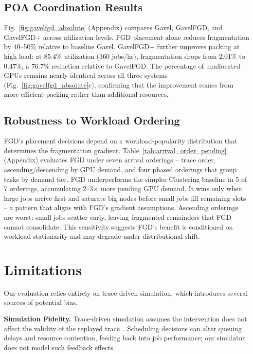 \documentclass[conference]{IEEEtran}
\begin{document}
\subsection{POA Coordination Results}

Fig.~\ref{fig:gavelfgd_absolute} (Appendix) compares Gavel, GavelFGD, and GavelFGD+ across utilization levels.
FGD placement alone reduces fragmentation by 40--50\% relative to baseline Gavel.
GavelFGD+ further improves packing at high load: at 85.4\% utilization (360 jobs/hr), fragmentation drops from 2.01\% to 0.47\%, a 76.7\% reduction relative to GavelFGD.
The percentage of unallocated GPUs remains nearly identical across all three systems (Fig.~\ref{fig:gavelfgd_absolute}c), confirming that the improvement comes from more efficient packing rather than additional resources.

\subsection{Robustness to Workload Ordering}

FGD's placement decisions depend on a workload-popularity distribution that determines the fragmentation gradient.
Table~\ref{tab:arrival_order_pending} (Appendix) evaluates FGD under seven arrival orderings -- trace order, ascending/descending by GPU demand, and four phased orderings that group tasks by demand tier.
FGD underperforms the simpler Clustering baseline in 5 of 7 orderings, accumulating 2--3$\times$ more pending GPU demand.
It wins only when large jobs arrive first and saturate big nodes before small jobs fill remaining slots -- a pattern that aligns with FGD's gradient assumptions.
Ascending orderings are worst: small jobs scatter early, leaving fragmented remainders that FGD cannot consolidate.
This sensitivity suggests FGD's benefit is conditioned on workload stationarity and may degrade under distributional shift.

\section{Limitations}
Our evaluation relies entirely on trace-driven simulation, which introduces several sources of potential bias.

\textbf{Simulation Fidelity.}
Trace-driven simulation assumes the intervention does not affect the validity of the replayed trace~\cite{CAUSALSIM}.
Scheduling decisions can alter queuing delays and resource contention, feeding back into job performance; our simulator does not model such feedback effects.
\end{document}
